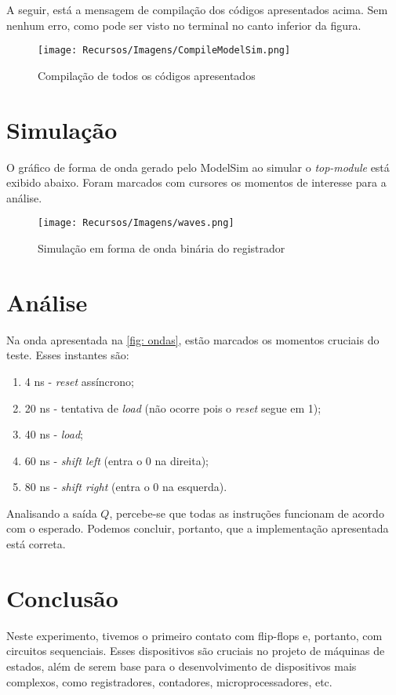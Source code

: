 \documentclass[a4paper,12pt]{article}
\begin{document}
A seguir, está a mensagem de compilação dos códigos apresentados acima. Sem nenhum erro, como pode ser visto no terminal no canto inferior da figura.

\begin{figure}[H]
    \centering
    \texttt{[image: Recursos/Imagens/CompileModelSim.png]}
    \caption{Compilação de todos os códigos apresentados}
\end{figure}

\section{Simulação}
O gráfico de forma de onda gerado pelo ModelSim ao simular o \textit{top-module} está exibido abaixo. Foram marcados com cursores os momentos de interesse para a análise.

\begin{figure}[H]
    \centering
    \begin{tcolorbox}[colframe=cinza, colback=white, boxrule=0.75pt, arc=0pt, width=1\textwidth, center, boxsep=0pt, left=0pt, right=0pt, top=0pt, bottom=0pt]
    \texttt{[image: Recursos/Imagens/waves.png]}
    \end{tcolorbox}
    \caption{Simulação em forma de onda binária do registrador}
    \label{fig: ondas}
\end{figure}

\section{Análise}
Na onda apresentada na \autoref{fig: ondas}, estão marcados os momentos cruciais do teste. Esses instantes são: 
\begin{enumerate}
    \item 4 ns - \textit{reset} assíncrono;
    \item 20 ns - tentativa de \textit{load} (não ocorre pois o \textit{reset} segue em 1);
    \item 40 ns - \textit{load};
    \item 60 ns - \textit{shift left} (entra o 0 na direita);
    \item 80 ns - \textit{shift right} (entra o 0 na esquerda).
\end{enumerate}
Analisando a saída $Q$, percebe-se que todas as instruções funcionam de acordo com o esperado. Podemos concluir, portanto, que a implementação apresentada está correta.

\section{Conclusão}
Neste experimento, tivemos o primeiro contato com flip-flops e, portanto, com circuitos sequenciais. Esses dispositivos são cruciais no projeto de máquinas de estados, além de serem base para o desenvolvimento de dispositivos mais complexos, como registradores, contadores, microprocessadores, etc.
\end{document}
